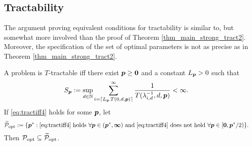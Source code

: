 \documentclass[11pt,a4paper]{article}
\begin{document}
\subsection{Tractability} \label{sec:tractability}


The argument proving equivalent conditions for tractability is similar to, but somewhat more involved than the proof of Theorem \ref{thm_main_strong_tract2}.  Moreover, the specification of the set of optimal parameters is not as precise as in Theorem \ref{thm_main_strong_tract2}.

\begin{theorem}\label{thm_main_tract2}
A problem is $T$-tractable iff there exist $\boldsymbol{p}\ge \boldsymbol{0}$ and a constant $L_{\boldsymbol{p}} > 0$ such that
\begin{equation} \label{eq:tractiff4}
     S_{\boldsymbol{p}}:=\sup_{d \in \mathbb{N}}
     \sum_{i = \lceil L_{\boldsymbol{p}}\, T(0,d,\boldsymbol{p}) \rceil}^\infty \frac{1}{T(\lambda^{-1}_{i,d},d,\boldsymbol{p})}< \infty.
\end{equation}
If \eqref{eq:tractiff4} holds for some $\boldsymbol{p}$, let  
\[
\widetilde{\mathcal{P}}_{\textup{opt}} : = \{\boldsymbol{p}^* : \eqref{eq:tractiff4} \text{ holds }\forall \boldsymbol{p} \in (\boldsymbol{p}^*,\boldsymbol{\infty}) \text{ and }  \eqref{eq:tractiff4} \text{ does not hold } \forall \boldsymbol{p} \in [\boldsymbol{0},\boldsymbol{p}^*/2)\}.
\]
Then $\mathcal{P}_{\textup{opt}} \subseteq \widetilde{\mathcal{P}}_{\textup{opt}}$.
\
\end{theorem}
\end{document}
